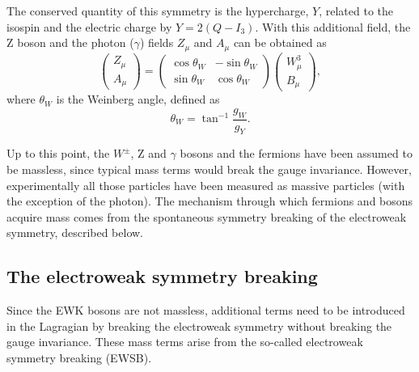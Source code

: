 \documentclass[../main.tex]{subfiles}
\begin{document}
The conserved quantity of this symmetry is the hypercharge, $Y$, related to the isospin and the electric charge by $Y = 2 (Q - I_3)$. With this additional field, the Z boson and the photon ($\gamma$) fields $Z_\mu$ and $A_\mu$ can be obtained as
\begin{equation}
\label{theo:eq:az}
\left(
\begin{matrix}
Z_\mu \\
A_\mu
\end{matrix}
\right)
=
\left(
\begin{matrix}
\cos \theta_W & - \sin \theta_W \\
\sin \theta_W &   \cos \theta_W
\end{matrix}
\right)
\left(
\begin{matrix}
W^3_\mu \\
B_\mu
\end{matrix}
\right),
\end{equation}
where $\theta_W$ is the Weinberg angle, defined as
\begin{equation}
\theta_W = \tan^{-1} \frac{g_W}{g_Y}.
\end{equation}

Up to this point, the $W^\pm$, Z and $\gamma$ bosons and the fermions have been assumed to be massless, since typical mass terms would break the gauge invariance. However, experimentally all those particles have been measured as massive particles (with the exception of the photon). The mechanism through which fermions and bosons acquire mass comes from the spontaneous symmetry breaking of the electroweak symmetry, described below.

\subsection{The electroweak symmetry breaking}
\label{theo:subsec:ewsb}

Since the EWK bosons are not massless, additional terms need to be introduced in the Lagragian by breaking the electroweak symmetry without breaking the gauge invariance. These mass terms arise from the so-called electroweak symmetry breaking (EWSB).
\end{document}

